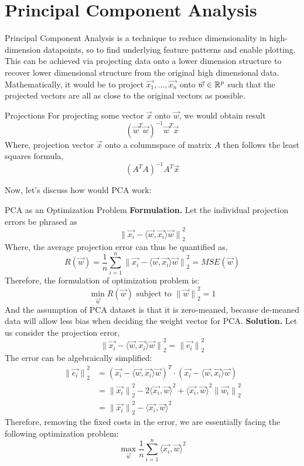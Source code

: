 \section{Principal Component Analysis}
Principal Component Analysis is a technique to reduce dimensionality in high-dimension datapoints, so to find underlying feature patterns and enable plotting. \\
This can be achieved via projecting data onto a lower dimension structure to recover lower dimensional structure from the original high dimensional data. \\
Mathematically, it would be to project $\vec{x_1}, \dots, \vec{x_n}$ onto $\vec{w} \in \mathbb{R}^p$ such that the projected vectors are all as close to the original vectors as possible.
\begin{ln-explain}{Projections}{}
    For projecting some vector $\vec{x}$ onto $\vec{w}$, we would obtain result
    \[
        {(\vec{w}^T \vec{w})}^{-1} \vec{w}^T \vec{x}
    \]
    Where, projection vector $\vec{x}$ onto a columnspace of matrix $A$ then follows the least squares formula,
    \[
        {(A^T A)}^{-1} A^T \vec{x}
    \]
\end{ln-explain}
Now, let's discuss how would PCA work:
\begin{ln-explain}{PCA as an Optimization Problem}{}
    \textbf{Formulation.} 
    Let the individual projection errors be phrased as
    \[{\lVert \vec{x_i} - \langle \vec{w}, \vec{x_i} \rangle \vec{w} \rVert}_2^2\]
    Where, the average projection error can thus be quantified as,
    \[
        R(\vec{w}) = \frac{1}{n} \sum_{i = 1}^n {\lVert \vec{x_i} - \langle \vec{w}, \vec{x_i} \rangle \vec{w} \rVert}_2^2 = MSE(\vec{w})
    \]
    Therefore, the formulation of optimization problem is:
    \[
        \min_{\vec{w}} R(\vec{w}) \text{ subject to } {\lVert \vec{w} \rVert}_2^2 = 1
    \]
    And the assumption of PCA dataset is that it is zero-meaned, because de-meaned data will allow less bias when deciding the weight vector for PCA.
    \tcblower
    \textbf{Solution.}
    Let us consider the projection error,
    \[
        {\lVert \vec{x_i} - \langle \vec{w}, \vec{x_i} \rangle \vec{w} \rVert}_2^2 = {\lVert \vec{e_i} \rVert}_2^2
    \]
    The error can be algebraically simplified:
    \begin{align*}
        {\lVert \vec{e_i} \rVert}_2^2
        &= {(\vec{x_i} - \langle \vec{w}, \vec{x_i} \rangle \vec{w})}^T \cdot (\vec{x_i} - \langle \vec{w}, \vec{x_i} \rangle \vec{w}) \\
        &= {\lVert \vec{x_i} \rVert}_2^2 - 2 {\langle \vec{x_i}, \vec{w} \rangle}^2 + {\langle \vec{x_i}, \vec{w} \rangle}^2 {\lVert \vec{w_i} \rVert}_2^2 \\
        &= {\lVert \vec{x_i} \rVert}_2^2 - {\langle \vec{x_i}, \vec{w} \rangle}^2
    \end{align*}
    Therefore, removing the fixed costs in the error, we are essentially facing the following optimization problem:
    \[
        \max_{\vec{w}} \frac{1}{n} \sum_{i = 1}^n {\langle \vec{x_i}, \vec{w} \rangle}^2
    \]
\end{ln-explain}
